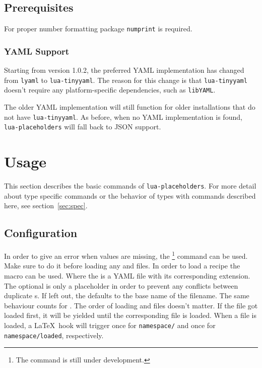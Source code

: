 \documentclass{ltxdoc}
\begin{document}
    \subsection{Prerequisites}
    For proper number formatting package \texttt{numprint}\cite{numprint} is required.

    \subsubsection{YAML Support}
    Starting from version 1.0.2, the preferred YAML implementation has changed from \texttt{lyaml}\cite{lyaml} to \texttt{lua-tinyyaml}\cite{lua-tinyyaml}.
    The reason for this change is that \texttt{lua-tinyyaml} doesn't require any platform-specific dependencies, such as \texttt{libYAML}\cite{libYAML}.

    The older YAML implementation will still function for older installations that do not have \texttt{lua-tinyyaml}.
    As before, when no YAML implementation is found, \texttt{lua-placeholders} will fall back to JSON support.


    \clearpage
    \section{Usage}
    This section describes the basic commands of \texttt{lua-placeholders}.
    For more detail about type specific commands or the behavior of types with commands described here, see section~\ref{sec:spec}.\\

    \subsection{Configuration}
    \DescribeMacro{\strictparams} In order to give an error when values are missing, the \cmd{\strictparams}\footnote{The \cmd{\strictparams} command is still under development.} command can be used.
    Make sure to do it before loading any  and  files.
    \DescribeMacro{\loadrecipe}
    In order to load a recipe the macro \cmd{\loadrecipe} can be used.
    Where the  is a YAML file with its corresponding extension.
    The optional  is only a placeholder in order to prevent any conflicts between duplicate s.
    If left out, the  defaults to the base name of the filename.
    \DescribeMacro{\loadpayload} The same behaviour counts for \cmd{\loadpayload}.
    The order of loading  and  files doesn't matter.
    If the  file got loaded first, it will be yielded until the corresponding  file is loaded.
    When a file is loaded, a \LaTeX\ hook will trigger once for \texttt{namespace/} and once for \texttt{namespace/loaded}, respectively.
\end{document}
